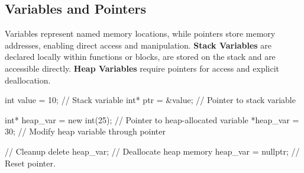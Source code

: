 



\subsection{Variables and Pointers}

\vspace{-0.3em}


Variables represent named memory locations, while pointers store memory addresses, enabling direct access and manipulation.
\textbf{Stack Variables} are declared locally within functions or blocks, are stored on the stack and are accessible directly.
\textbf{Heap Variables} require pointers for access and explicit deallocation.

\begin{exampleblock}
    \begin{codeblock}[language=C++]
int value = 10;       // Stack variable
int* ptr = &value;    // Pointer to stack variable

int* heap_var = new int(25); // Pointer to heap-allocated variable
*heap_var = 30;       // Modify heap variable through pointer

// Cleanup
delete heap_var;      // Deallocate heap memory
heap_var = nullptr;   // Reset pointer.
    \end{codeblock}
\end{exampleblock}

